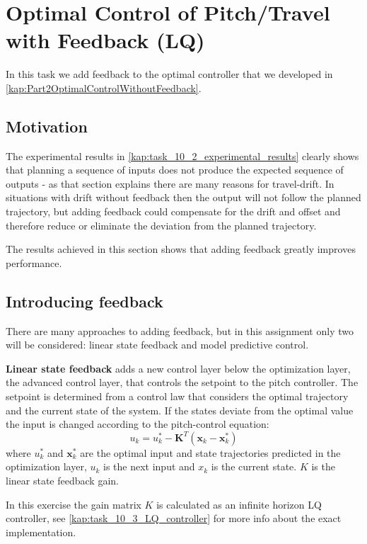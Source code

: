 \documentclass[../main.tex]{subfiles}
\begin{document}
\section{Optimal Control of Pitch/Travel with Feedback (LQ)}  \label{sec:lab3}
In this task we add feedback to the optimal controller that we developed in \cref{kap:Part2OptimalControlWithoutFeedback}.

\subsection{Motivation}
The experimental results in \cref{kap:task_10_2_experimental_results} clearly shows that planning a sequence of inputs does not produce the expected sequence of outputs - as that section explains there are many reasons for travel-drift. In situations with drift without feedback then the output will not follow the planned trajectory, but adding feedback could compensate for the drift and offset and therefore reduce or eliminate the deviation from the planned trajectory.

The results achieved in this section shows that adding feedback greatly improves performance.

\subsection{Introducing feedback}
There are many approaches to adding feedback, but in this assignment only two will be considered: linear state feedback and model predictive control.

\textbf{Linear state feedback} adds a new control layer below the optimization layer, the advanced control layer, that controls the setpoint to the pitch controller. The setpoint is determined from a control law that considers the optimal trajectory and the current state of the system. If the states deviate from the optimal value the input is changed according to the pitch-control equation:
\begin{equation}\label{eq:lab3_feedback}
	u_k = u_k^* - \bm{K}^T(\bm x_k - \bm x_k^*)
\end{equation}
where $u_k^*$ and $\bm x_k^*$ are the optimal input and state trajectories predicted in the optimization layer, $u_k$ is the next input and $x_k$ is the current state. $K$ is the linear state feedback gain. 

In this exercise the gain matrix $K$ is calculated as an infinite horizon LQ controller, see \cref{kap:task_10_3_LQ_controller} for more info about the exact implementation.
\end{document}
